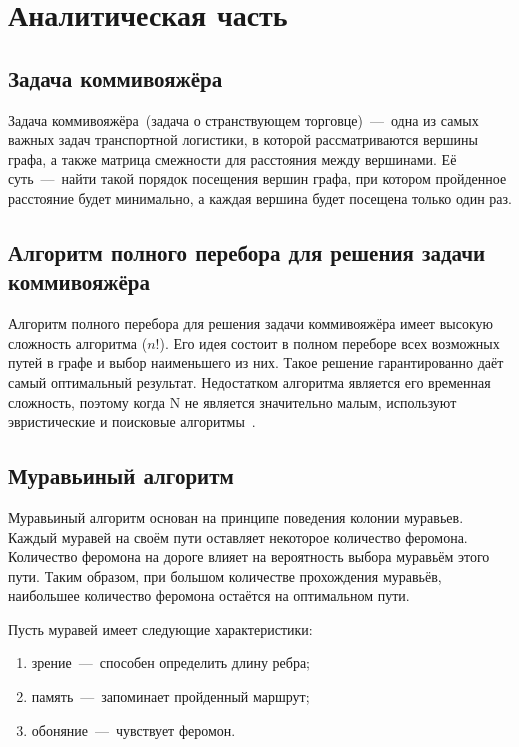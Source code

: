 \chapter{Аналитическая часть}

\section{Задача коммивояжёра}

Задача коммивояжёра~(задача о странствующем торговце)~---~одна из самых
важных задач транспортной логистики, в которой рассматриваются вершины
графа, а также матрица смежности для расстояния между вершинами. Её
суть~---~найти такой порядок посещения вершин графа, при котором пройденное расстояние будет минимально, а каждая вершина будет посещена только один раз.


\section{Алгоритм полного перебора для решения задачи коммивояжёра}

Алгоритм полного перебора для решения задачи коммивояжёра имеет высокую сложность алгоритма ($n!$). Его идея состоит в полном переборе всех возможных путей в графе и выбор наименьшего из них. Такое решение гарантированно даёт самый оптимальный результат. Недостатком алгоритма является его временная сложность, поэтому когда N не является значительно малым, используют эвристические и поисковые алгоритмы~\cite{book_tsp}.

\section{Муравьиный алгоритм}

Муравьиный алгоритм основан на принципе поведения колонии муравьев. Каждый муравей на своём пути оставляет некоторое количество феромона. Количество феромона на дороге влияет на вероятность выбора муравьём этого пути. Таким образом, при большом количестве прохождения муравьёв, наибольшее количество феромона остаётся на оптимальном пути.

Пусть муравей имеет следующие характеристики:
\begin{enumerate}[label=---]
	\item зрение~---~способен определить длину ребра;
	\item память~---~запоминает пройденный маршрут;
	\item обоняние~---~чувствует феромон.
\end{enumerate}

